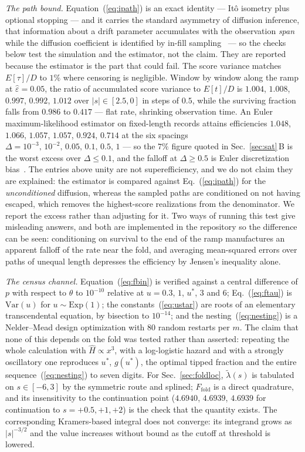 \documentclass[%
 aip,
 cha,
 amsmath,amssymb,
 reprint,
 superscriptaddress,
 floatfix,
]{revtex4-2}
\newcommand{\Sig}{\hat\varepsilon}
\begin{document}
\emph{The path bound.}  Equation~(\ref{eq:ipath}) is an exact identity --- It\^o isometry plus optional stopping --- and it carries the standard asymmetry of diffusion inference, that information about a drift parameter accumulates with the observation \emph{span} while the diffusion coefficient is identified by in-fill sampling~\cite{Merton1980,Gobet2001} --- so the checks below test the simulation and the estimator, not the claim.  They are reported because the estimator is the part that could fail.  The score variance matches $E[\tau]/D$ to $1\%$ where censoring is negligible.  Window by window along the ramp at $\Sig=0.05$, the ratio of accumulated score variance to $E[t]/D$ is $1.004$, $1.008$, $0.997$, $0.992$, $1.012$ over $|s|\in[2.5,0]$ in steps of $0.5$, while the surviving fraction falls from $0.986$ to $0.417$ --- flat rate, shrinking observation time.  An Euler maximum-likelihood estimator on fixed-length records attains efficiencies $1.048$, $1.066$, $1.057$, $1.057$, $0.924$, $0.714$ at the six spacings $\Delta=10^{-3},\,10^{-2},\,0.05,\,0.1,\,0.5,\,1$ --- so the $7\%$ figure quoted in Sec.~\ref{sec:sat}\,B is the worst excess over $\Delta\le0.1$, and the falloff at $\Delta\ge0.5$ is Euler discretization bias~\cite{FlorensZmirou1989}.  The entries above unity are not superefficiency, and we do not claim they are explained: the estimator is compared against Eq.~(\ref{eq:ipath}) for the \emph{unconditioned} diffusion, whereas the sampled paths are conditioned on not having escaped, which removes the highest-score realizations from the denominator.  We report the excess rather than adjusting for it.  Two ways of running this test give misleading answers, and both are implemented in the repository so the difference can be seen: conditioning on survival to the end of the ramp manufactures an apparent falloff of the rate near the fold, and averaging mean-squared errors over paths of unequal length depresses the efficiency by Jensen's inequality alone.

\emph{The census channel.}  Equation~(\ref{eq:fbin}) is verified against a central difference of $p$ with respect to $\theta$ to $10^{-10}$ relative at $u=0.3$, $1$, $u^\ast$, $3$ and $6$; Eq.~(\ref{eq:ftau}) is $\mathrm{Var}(u)$ for $u\sim\mathrm{Exp}(1)$; the constants~(\ref{eq:ustar}) are roots of an elementary transcendental equation, by bisection to $10^{-14}$; and the nesting~(\ref{eq:nesting}) is a Nelder--Mead design optimization with $80$ random restarts per $m$.  The claim that none of this depends on the fold was tested rather than asserted: repeating the whole calculation with $\hat H\propto x^3$, with a log-logistic hazard and with a strongly oscillatory one reproduces $u^\ast$, $g(u^\ast)$, the optimal tipped fraction and the entire sequence~(\ref{eq:nesting}) to seven digits.  For Sec.~\ref{sec:foldloc}, $\tilde\lambda(s)$ is tabulated on $s\in[-6,3]$ by the symmetric route and splined; $F_{\mathrm{fold}}$ is a direct quadrature, and its insensitivity to the continuation point ($4.6940$, $4.6939$, $4.6939$ for continuation to $s=+0.5,+1,+2$) is the check that the quantity exists.  The corresponding Kramers-based integral does not converge: its integrand grows as $|s|^{-3/2}$ and the value increases without bound as the cutoff at threshold is lowered.
\end{document}
